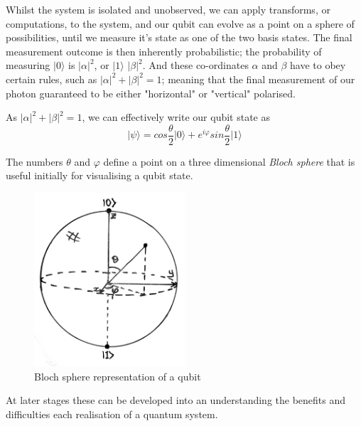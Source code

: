 Whilst the system is isolated and unobserved, we can apply transforms, or computations, to the system,
and our qubit can evolve as a point on a sphere of possibilities, 
until we measure it's state as one of the two basis states.
The final measurement outcome is then inherently probabilistic; 
the probability of measuring $\lvert0\rangle$ is $\lvert\alpha\lvert^2$, or $\lvert1\rangle$ $\lvert\beta\lvert^2$.
And these co-ordinates $\alpha$ and $\beta$ have to obey certain rules, 
such as $\lvert\alpha\lvert^2 + \lvert\beta\lvert^2 = 1$; 
meaning that the final measurement of our photon guaranteed to be either "horizontal" or "vertical" polarised.

As $\lvert\alpha\lvert^2 + \lvert\beta\lvert^2 = 1$, we can effectively write our qubit state as \cite{Nielsen:2010}
$$\lvert\psi\rangle = cos \frac{\theta}{2} \lvert0\rangle + e^{i\varphi} sin \frac{\theta}{2} \lvert1\rangle $$

The numbers $\theta$ and $\varphi$ define a point on a three dimensional \emph{Bloch sphere} 
that is useful initially for visualising a qubit state.

\begin{figure}[ht] 
	\begin{adjustbox}{center}
		\includegraphics[width=0.5\textwidth, inner]{figures/blochsphere.png}
	\end{adjustbox}
	\vspace{4pt}
	\caption{Bloch sphere representation of a qubit}
	\label{fig:bloch_sphere}
\end{figure}

At later stages these can be developed into an understanding the benefits and difficulties each 
realisation of a quantum system.

